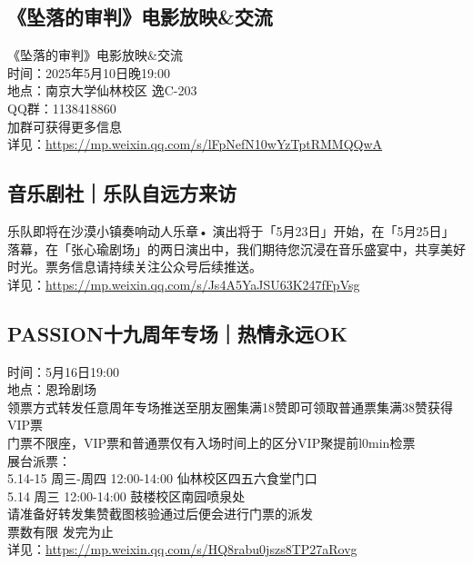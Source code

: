 \documentclass[letterpaper, 12pt]{article}
\begin{document}
\begin{multicols}{2}
\subsection{《坠落的审判》电影放映\&交流} %
《坠落的审判》电影放映\&交流
\\时间：2025年5月10日晚19:00
\\地点：南京大学仙林校区 逸C-203
\\QQ群：1138418860
\\加群可获得更多信息
\\详见：\url{https://mp.weixin.qq.com/s/lFpNefN10wYzTptRMMQQwA}

\subsection{音乐剧社｜乐队自远方来访} %
乐队即将在沙漠小镇奏响动人乐章• 演出将于「5月23日」开始，在「5月25日」落幕，在「张心瑜剧场」的两日演出中，我们期待您沉浸在音乐盛宴中，共享美好时光。票务信息请持续关注公众号后续推送。
\\详见：\url{https://mp.weixin.qq.com/s/Js4A5YaJSU63K247fFpVsg}

\subsection{PASSION十九周年专场｜热情永远OK} %
时间：5月16日19:00
\\地点：恩玲剧场
\\领票方式转发任意周年专场推送至朋友圈集满18赞即可领取普通票集满38赞获得VIP票
\\门票不限座，VIP票和普通票仅有入场时间上的区分VIP聚提前l0min检票
\\展台派票：
\\5.14-15 周三-周四 12:00-14:00 仙林校区四五六食堂门口
\\5.14 周三 12:00-14:00 鼓楼校区南园喷泉处
\\请准备好转发集赞截图核验通过后便会进行门票的派发
\\票数有限 发完为止
\\详见：\url{https://mp.weixin.qq.com/s/HQ8rabu0jszs8TP27aRovg}

\end{multicols}
\end{document}
